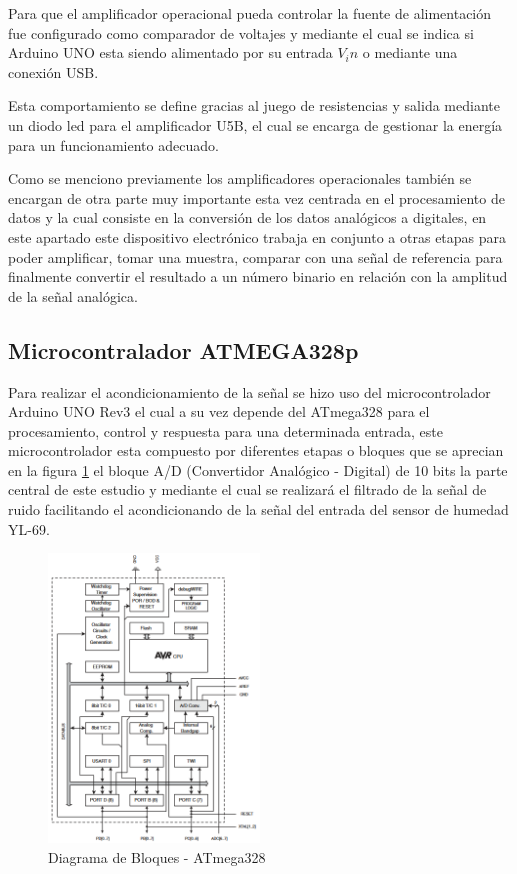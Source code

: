 \documentclass[conference]{IEEEtran}
\begin{document}
	Para que el amplificador operacional pueda controlar la fuente de alimentación fue configurado como comparador de voltajes y mediante el cual se indica si Arduino UNO esta siendo alimentado por su entrada $V_in$ o mediante una conexión USB.
	
	Esta comportamiento se define gracias al juego de resistencias y salida mediante un diodo led para el amplificador U5B, el cual se encarga de gestionar la energía para un funcionamiento adecuado.
	
	Como se menciono previamente los amplificadores operacionales también se encargan de otra parte muy importante esta vez centrada en el procesamiento de datos y la cual consiste en la conversión de los datos analógicos a digitales, en este apartado este dispositivo electrónico trabaja en conjunto a otras etapas para poder amplificar, tomar una muestra, comparar con una señal de referencia para finalmente convertir el resultado a un número binario en relación con la amplitud de la señal analógica.
		
	\subsection{Microcontralador ATMEGA328p}
	Para realizar el acondicionamiento de la señal se hizo uso del microcontrolador Arduino UNO Rev3 el cual a su vez depende del ATmega328 para el procesamiento, control y respuesta para una determinada entrada, este microcontrolador esta compuesto por diferentes etapas o bloques que se aprecian en la figura \ref{fig:esquema-atmega328} el bloque A/D (Convertidor Analógico - Digital) de 10 bits la parte central de este estudio y mediante el cual se realizará el filtrado de la señal de ruido facilitando el acondicionando de la señal del entrada del sensor de humedad YL-69.
	
	\begin{figure}[h]
		\centering
		\includegraphics[width=0.5\textwidth]{media/esquema-atmega328}
		\caption{Diagrama de Bloques - ATmega328}
		\label{fig:esquema-atmega328}
	\end{figure}
	
\end{document}
